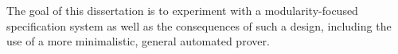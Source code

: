 \documentclass[10pt]{ClemsonProposal}
\begin{document}
The goal of this dissertation is to experiment with a modularity-focused specification system as well as the consequences of such a design, including the use of a more minimalistic, general automated prover.


    
    
    
    
    
%    
%    
%    
    



\end{document}
